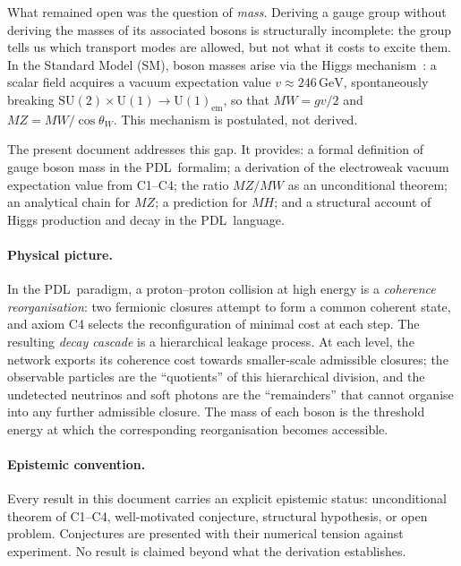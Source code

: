 \documentclass[12pt,a4paper]{article}
\theoremstyle{remark}
\newcommand{\PDL}{\textsc{pdl}}
\newcommand{\cosW}{\cos\theta_{W}}
\newcommand{\MZ}{M_{Z}}
\newcommand{\MW}{M_{W}}
\newcommand{\MH}{M_{H}}
\newcommand{\vev}{v}
\newcommand{\GeV}{\,\mathrm{GeV}}
\def\PDL{PDL}%
\def\MZ{MZ}%
\def\MW{MW}%
\def\MH{MH}%
\begin{document}
What remained open was the question of \emph{mass}. Deriving a gauge group
without deriving the masses of its associated bosons is structurally incomplete:
the group tells us which transport modes are allowed, but not what it costs to
excite them. In the Standard Model (SM), boson masses arise via the Higgs
mechanism~\cite{Higgs1964,Brout1964}: a scalar field acquires a vacuum
expectation value $\vev\approx246\GeV$, spontaneously breaking $\mathrm{SU}(2)
\times\mathrm{U}(1)\to\mathrm{U}(1)_{\mathrm{em}}$, so that $\MW=g\vev/2$ and
$\MZ=\MW/\cosW$. This mechanism is postulated, not derived.

The present document addresses this gap. It provides: a formal definition of
gauge boson mass in the \PDL\ formalim; a derivation of the electroweak vacuum
expectation value from C1--C4; the ratio $\MZ/\MW$ as an unconditional theorem;
an analytical chain for $\MZ$; a prediction for $\MH$; and a structural account
of Higgs production and decay in the \PDL\ language.

\paragraph{Physical picture.} In the \PDL\ paradigm, a proton--proton collision
at high energy is a \emph{coherence reorganisation}: two fermionic closures
attempt to form a common coherent state, and axiom C4 selects the
reconfiguration of minimal cost at each step. The resulting \emph{decay cascade}
is a hierarchical leakage process. At each level, the network exports its
coherence cost towards smaller-scale admissible closures; the observable
particles are the ``quotients'' of this hierarchical division, and the
undetected neutrinos and soft photons are the ``remainders'' that cannot
organise into any further admissible closure. The mass of each boson is the
threshold energy at which the corresponding reorganisation becomes accessible.

\paragraph{Epistemic convention.} Every result in this document carries an
explicit epistemic status: unconditional theorem of C1--C4, well-motivated
conjecture, structural hypothesis, or open problem. Conjectures are presented
with their numerical tension against experiment. No result is claimed beyond
what the derivation establishes.

\end{document}
